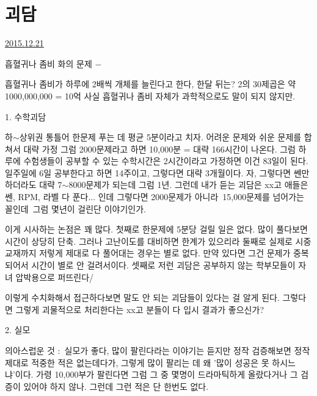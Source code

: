 \section{괴담}
\href{https://www.kockoc.com/Apoc/556127}{2015.12.21}

\vspace{5mm}

흡혈귀나 좀비 화의 문제 $-$
\vspace{5mm}

흡혈귀나 좀비가 하루에 2배씩 개체를 늘린다고 한다, 한달 뒤는?
2의 30제곱은 약 1000,000,000 = 10억
사실 흡혈귀나 좀비 자체가 과학적으로도 말이 되지 않지만.
\vspace{5mm}

\item 1. 수학괴담
\vspace{5mm}

하$\sim$상위권 통틀어 한문제 푸는 데 평균 5분이라고 치자. 어려운 문제와 쉬운 문제를 합쳐서 대략 가정
그럼 2000문제라고 하면 10,000분 = 대략 166시간이 나온다.
그럼 하루에 수험생들이 공부할 수 있는 수학시간은 2시간이라고 가정하면 이건 83일이 된다.
일주일에 6일 공부한다고 하면 14주이고, 그렇다면 대략 3개월이다.
자, 그렇다면 쎈만 하더라도 대략 7$\sim$8000문제가 되는데 그럼 1년.
그런데 내가 듣는 괴담은 xx고 애들은 쎈, RPM, 라벨 다 푼다... 인데
그렇다면 2000문제가 아니라 15,000문제를 넘어가는 꼴인데 그럼 몇년이 걸린단 이야기인가.
\vspace{5mm}

이게 시사하는 논점은 꽤 많다.
첫째로 한문제에 5분당 걸릴 일은 없다. 많이 풀다보면 시간이 상당히 단축. 그러나 고난이도를 대비하면 한계가 있으리라
둘째로 실제로 시중교재까지 저렇게 제대로 다 풀어대는 경우는 별로 없다. 만약 있다면 그건 문제가 중복되어서 시간이 별로 안 걸려서이다.
셋째로 저런 괴담은 공부하지 않는 학부모들이 자녀 압박용으로 퍼뜨린다/
\vspace{5mm}

이렇게 수치화해서 접근하다보면 말도 안 되는 괴담들이 있다는 걸 알게 된다.
그렇다면 그렇게 괴물적으로 처리한다는 xx고 분들이 다 입시 결과가 좋으신가?
\vspace{5mm}

\item 2. 실모
\vspace{5mm}

의아스럽운 것 : 실모가 좋다, 많이 팔린다라는 이야기는 듣지만
정작 검증해보면 정작 제대로 적중한 적은 없는데다가, 그렇게 많이 팔리는 데 왜 '많이 성공은 못 하시느냐'이다.
가령 10,000부가 팔린다면 그럼 그 중 몇명이 드라마틱하게 올랐다거나 그 검증이 있어야 하지 않나. 그런데 그런 적은 단 한번도 없다.
\vspace{5mm}

